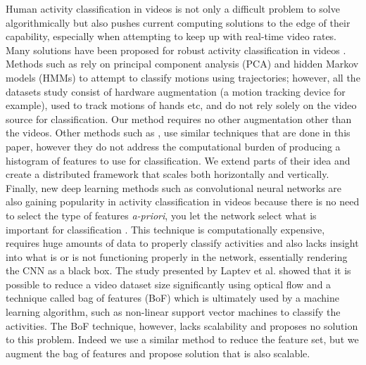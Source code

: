 \PARstart Human activity classification in videos is not only a difficult problem to solve
algorithmically but also pushes current computing solutions to the edge of their
capability, especially when attempting to keep up with real-time video rates.
Many solutions have been proposed for robust activity classification in videos
\cite{niebles2010modeling} \cite{bashir2007object} \cite{ribeiro2005human}
\cite{karpathy2014large}. Methods such as \cite{bashir2007object} rely on
principal component analysis (PCA) and hidden Markov models (HMMs) to attempt to
classify motions using trajectories; however, all the datasets study consist of
hardware augmentation (a motion tracking device for example), used to track
motions of hands etc, and do not rely solely on the video source for
classification. Our method requires no other augmentation  other than the
videos.  Other methods such as \cite{niebles2010modeling}, use similar
techniques that are done in this paper, however they do not address the
computational burden of producing a histogram of features to use for
classification. We extend parts of their idea and create a distributed  framework that
scales both horizontally and vertically. Finally, new deep learning methods such
as convolutional neural networks are also gaining popularity in activity
classification in videos because there is no need to select the type of features
\textit{a-priori}, you let the network select what is important for
classification \cite{karpathy2014large}. This technique is computationally
expensive, requires huge amounts of data to properly classify activities
\cite{karpathy2014large} and also lacks insight into what is or is not
functioning properly  in the network, essentially rendering the CNN as a black
box. The study presented by Laptev et al. \cite{laptev2008learning} showed that
it is possible to reduce a video dataset size significantly using optical flow
and a technique called bag of features (BoF) which is ultimately used by a
machine learning algorithm, such as non-linear support vector machines to
classify the activities. The BoF technique, however, lacks scalability and
proposes no solution to this problem. Indeed we use a similar method to
reduce the feature set, but we augment the bag of features and propose
solution that is also scalable.

